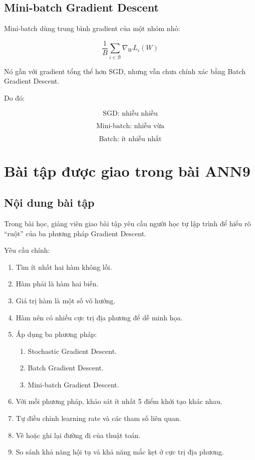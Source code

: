 \subsection{Mini-batch Gradient Descent}

Mini-batch dùng trung bình gradient của một nhóm nhỏ:

\[
    \frac{1}{B}
    \sum_{i\in \mathcal{B}}
    \nabla_W L_i(W)
\]

Nó gần với gradient tổng thể hơn SGD, nhưng vẫn chưa chính xác bằng Batch Gradient Descent.

Do đó:

\[
    \text{SGD: nhiễu nhiều}
\]

\[
    \text{Mini-batch: nhiễu vừa}
\]

\[
    \text{Batch: ít nhiễu nhất}
\]

\section{Bài tập được giao trong bài ANN9}

\subsection{Nội dung bài tập}

Trong bài học, giảng viên giao bài tập yêu cầu người học tự lập trình để hiểu rõ ``ruột'' của ba phương pháp Gradient Descent.

Yêu cầu chính:

\begin{enumerate}
    \item Tìm ít nhất hai hàm không lồi.
    \item Hàm phải là hàm hai biến.
    \item Giá trị hàm là một số vô hướng.
    \item Hàm nên có nhiều cực trị địa phương để dễ minh họa.
    \item Áp dụng ba phương pháp:
    \begin{enumerate}
        \item Stochastic Gradient Descent.
        \item Batch Gradient Descent.
        \item Mini-batch Gradient Descent.
    \end{enumerate}
    \item Với mỗi phương pháp, khảo sát ít nhất 5 điểm khởi tạo khác nhau.
    \item Tự điều chỉnh learning rate và các tham số liên quan.
    \item Vẽ hoặc ghi lại đường đi của thuật toán.
    \item So sánh khả năng hội tụ và khả năng mắc kẹt ở cực trị địa phương.
\end{enumerate}

